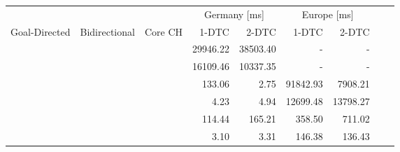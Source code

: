 \begin{tabular}{cccrrrrrr}
	\toprule
	              &               &         & \multicolumn{2}{c}{Germany [\si{\milli\second}]} & \multicolumn{2}{c}{Europe [\si{\milli\second}]}                 \\
	Goal-Directed & Bidirectional & Core CH & 1-DTC                                            & 2-DTC                                           & 1-DTC & 2-DTC \\
	\midrule
	\xmark        & \xmark        & \xmark  & 29946.22                                                & 38503.40                                               & -     & -     \\
	\xmark        & \cmark        & \xmark  & 16109.46                                                & 10337.35                                               & -     & -     \\
	\cmark        & \xmark        & \xmark  & 133.06                                                & 2.75                                               & 91842.93     & 7908.21     \\
	\cmark        & \cmark        & \xmark  & 4.23                                                & 4.94                                               & 12699.48     & 13798.27     \\
	\xmark        & \cmark        & \cmark  & 114.44                                                & 165.21                                               & 358.50     & 711.02     \\
	\cmark        & \cmark        & \cmark  & 3.10                                                & 3.31                                               & 146.38     & 136.43     \\
	\bottomrule
\end{tabular}